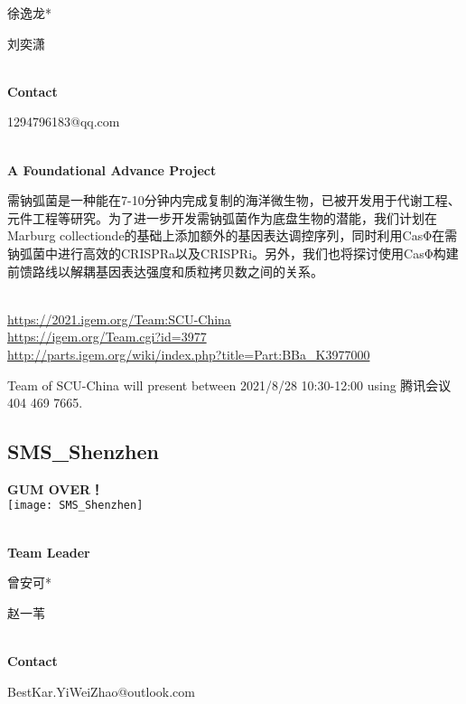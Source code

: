   徐逸龙*

  刘奕潇


\textbf{\\Contact}

  1294796183@qq.com


\textbf{\\A Foundational Advance Project\\}\begin{spacing}{1.5}

需钠弧菌是一种能在7-10分钟内完成复制的海洋微生物，已被开发用于代谢工程、元件工程等研究。为了进一步开发需钠弧菌作为底盘生物的潜能，我们计划在Marburg collectionde的基础上添加额外的基因表达调控序列，同时利用CasΦ在需钠弧菌中进行高效的CRISPRa以及CRISPRi。另外，我们也将探讨使用CasΦ构建前馈路线以解耦基因表达强度和质粒拷贝数之间的关系。\end{spacing}
\\

\url{https://2021.igem.org/Team:SCU-China }\\
\url{https://igem.org/Team.cgi?id=3977 }\\
\url{http://parts.igem.org/wiki/index.php?title=Part:BBa_K3977000 }\\


\vfill{}









Team of SCU-China will present between     2021/8/28 10:30-12:00    using 腾讯会议 404 469 7665.
\newpage


\subsection{\textcolor{Blu}{ SMS\_Shenzhen } }
\vspace{5mm}
\begin{center}
\large{
  \textbf{ GUM OVER！ }\\

  \texttt{[image: SMS\_Shenzhen]}
}
\end{center}
\textbf{\\Team Leader}

  曾安可*

  赵一苇


\textbf{\\Contact}

  BestKar.YiWeiZhao@outlook.com


